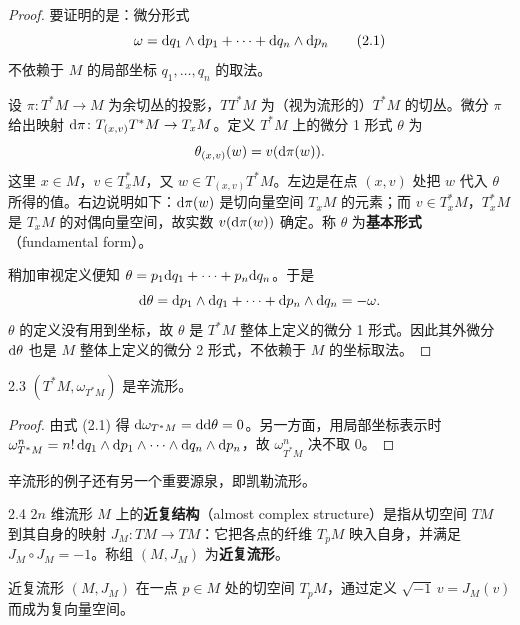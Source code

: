 \begin{proof}
  要证明的是：微分形式
  \begin{equation}
    \omega = \mathrm{d} q_1\wedge\mathrm{d} p_1+\cdots+\mathrm{d} q_n\wedge\mathrm{d} p_n \tag{2.1}
  \end{equation}
  不依赖于 $M$ 的局部坐标 $q_1,\dots,q_n$ 的取法。

  设 $\pi\colon T^*M\to M$ 为余切丛的投影，$TT^*M$ 为（视为流形的）$T^*M$ 的切丛。微分 $\pi$ 给出映射 $\mathrm{d}\pi\colon T_{(x,v)}T^*M\to T_xM$。定义 $T^*M$ 上的微分 1 形式 $\theta$ 为
  \[
    \theta_{(x,v)}(w)=v(\mathrm{d}\pi(w)).
  \]
  这里 $x\in M$，$v\in T_x^*M$，又 $w\in T_{(x,v)}T^*M$。左边是在点 $(x,v)$ 处把 $w$ 代入 $\theta$ 所得的值。右边说明如下：$\mathrm{d}\pi(w)$ 是切向量空间 $T_xM$ 的元素；而 $v\in T_x^*M$，$T_x^*M$ 是 $T_xM$ 的对偶向量空间，故实数 $v(\mathrm{d}\pi(w))$ 确定。称 $\theta$ 为\textbf{基本形式}（fundamental form）。

  稍加审视定义便知 $\theta=p_1\mathrm{d} q_1+\cdots+p_n\mathrm{d} q_n$。于是
  \[
    \mathrm{d}\theta=\mathrm{d} p_1\wedge\mathrm{d} q_1+\cdots+\mathrm{d} p_n\wedge\mathrm{d} q_n=-\omega.
  \]
  $\theta$ 的定义没有用到坐标，故 $\theta$ 是 $T^*M$ 整体上定义的微分 1 形式。因此其外微分 $\mathrm{d}\theta$ 也是 $M$ 整体上定义的微分 2 形式，不依赖于 $M$ 的坐标取法。
\end{proof}

\begin{lemma*}{2.3}
  $(T^*M,\omega_{T^*M})$ 是辛流形。
\end{lemma*}

\begin{proof}
  由式 (2.1) 得 $\mathrm{d}\omega_{T^*M}=\mathrm{d}\mathrm{d}\theta=0$。另一方面，用局部坐标表示时 $\omega_{T^*M}^n=n!\,\mathrm{d} q_1\wedge\mathrm{d} p_1\wedge\cdots\wedge\mathrm{d} q_n\wedge\mathrm{d} p_n$，故 $\omega_{T^*M}^n$ 决不取 0。
\end{proof}

辛流形的例子还有另一个重要源泉，即凯勒流形。

\begin{definition}{2.4}
  $2n$ 维流形 $M$ 上的\textbf{近复结构}（almost complex structure）是指从切空间 $TM$ 到其自身的映射 $J_M\colon TM\to TM$：它把各点的纤维 $T_pM$ 映入自身，并满足 $J_M\circ J_M=-1$。称组 $(M,J_M)$ 为\textbf{近复流形}。
\end{definition}

近复流形 $(M,J_M)$ 在一点 $p\in M$ 处的切空间 $T_pM$，通过定义 $\sqrt{-1}\,v=J_M(v)$ 而成为复向量空间。


